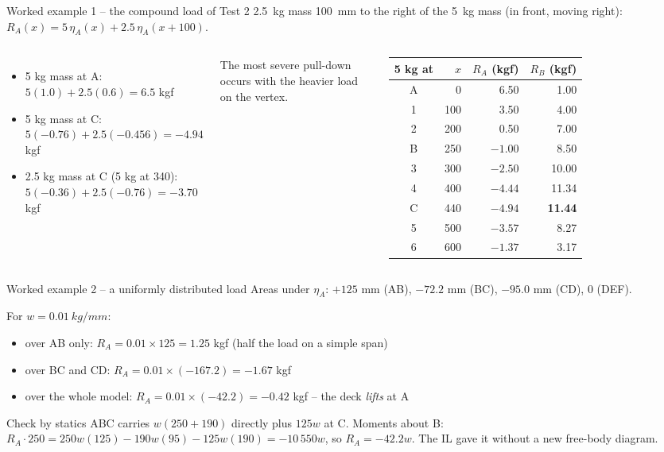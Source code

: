 \documentclass[aspectratio=169,11pt]{beamer}
\newcommand{\il}[1]{\eta_{#1}}
\begin{document}
\begin{frame}{Worked example 1 -- the compound load of Test 2}
\SI{2.5}{kg} mass \SI{100}{mm} to the right of the \SI{5}{kg} mass (in front, moving right): $R_A(x) = 5\,\il{A}(x) + 2.5\,\il{A}(x + 100)$.
\begin{columns}[T]
\begin{itemize}
  \item 5 kg mass at A: $5(1.0) + 2.5(0.6) = \mathbf{6.5}$ kgf
  \item 5 kg mass at C: $5(-0.76) + 2.5(-0.456) = \mathbf{-4.94}$ kgf
  \item 2.5 kg mass at C (5 kg at 340): $5(-0.36) + 2.5(-0.76) = -3.70$ kgf
\end{itemize}
The most severe pull-down occurs with the \alert{heavier} load on the vertex.
\small
\begin{tabular}{@{}c r r r@{}}
\toprule
5 kg at & $x$ & $R_A$ (kgf) & $R_B$ (kgf)\\
\midrule
A & 0 & 6.50 & 1.00\\
1 & 100 & 3.50 & 4.00\\
2 & 200 & 0.50 & 7.00\\
B & 250 & $-1.00$ & 8.50\\
3 & 300 & $-2.50$ & 10.00\\
4 & 400 & $-4.44$ & 11.34\\
C & 440 & $-4.94$ & \textbf{11.44}\\
5 & 500 & $-3.57$ & 8.27\\
6 & 600 & $-1.37$ & 3.17\\
\bottomrule
\end{tabular}
\end{columns}
\end{frame}

\begin{frame}{Worked example 2 -- a uniformly distributed load}
Areas under $\il{A}$: $+125$ mm (AB), $-72.2$ mm (BC), $-95.0$ mm (CD), 0 (DEF).
\medskip

For $w = \SI{0.01}{kg/mm}$:
\begin{itemize}
  \item over AB only: $R_A = 0.01 \times 125 = 1.25$ kgf (half the load on a simple span)
  \item over BC and CD: $R_A = 0.01 \times (-167.2) = -1.67$ kgf
  \item over the \alert{whole model}: $R_A = 0.01 \times (-42.2) = -0.42$ kgf -- the deck \emph{lifts} at A
\end{itemize}
\medskip
\begin{block}{Check by statics}
ABC carries $w(250 + 190)$ directly plus $125w$ at C. Moments about B: $R_A \cdot 250 = 250w(125) - 190w(95) - 125w(190) = -10\,550w$, so $R_A = -42.2w$. The IL gave it without a new free-body diagram.
\end{block}
\end{frame}
\end{document}
